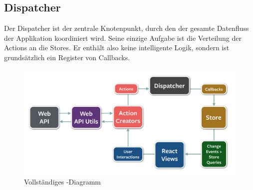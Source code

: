 \subsection{Dispatcher}
Der Dispatcher ist der zentrale Knotenpunkt, durch den der gesamte Datenfluss der Applikation koordiniert wird.
Seine einzige Aufgabe ist die Verteilung der Actions an die Stores.
Er enthält also keine intelligente Logik, sondern ist grundsätzlich ein Register von Callbacks.\newline
\begin{figure}[H]
 	\centering
 	\includegraphics[width=\textwidth]{images/projektdokumentation/flux-diagram.png}
 	\caption{Vollständiges -Diagramm}
 	\label{image-flux-overview-detailed}
\end{figure}